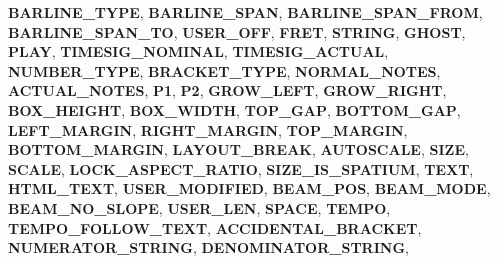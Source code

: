 \begin{DoxyCompactItemize}
{\bfseries B\+A\+R\+L\+I\+N\+E\+\_\+\+T\+Y\+PE}, 
{\bfseries B\+A\+R\+L\+I\+N\+E\+\_\+\+S\+P\+AN}, 
\newline
{\bfseries B\+A\+R\+L\+I\+N\+E\+\_\+\+S\+P\+A\+N\+\_\+\+F\+R\+OM}, 
{\bfseries B\+A\+R\+L\+I\+N\+E\+\_\+\+S\+P\+A\+N\+\_\+\+TO}, 
{\bfseries U\+S\+E\+R\+\_\+\+O\+FF}, 
{\bfseries F\+R\+ET}, 
\newline
{\bfseries S\+T\+R\+I\+NG}, 
{\bfseries G\+H\+O\+ST}, 
{\bfseries P\+L\+AY}, 
{\bfseries T\+I\+M\+E\+S\+I\+G\+\_\+\+N\+O\+M\+I\+N\+AL}, 
\newline
{\bfseries T\+I\+M\+E\+S\+I\+G\+\_\+\+A\+C\+T\+U\+AL}, 
{\bfseries N\+U\+M\+B\+E\+R\+\_\+\+T\+Y\+PE}, 
{\bfseries B\+R\+A\+C\+K\+E\+T\+\_\+\+T\+Y\+PE}, 
{\bfseries N\+O\+R\+M\+A\+L\+\_\+\+N\+O\+T\+ES}, 
\newline
{\bfseries A\+C\+T\+U\+A\+L\+\_\+\+N\+O\+T\+ES}, 
{\bfseries P1}, 
{\bfseries P2}, 
{\bfseries G\+R\+O\+W\+\_\+\+L\+E\+FT}, 
\newline
{\bfseries G\+R\+O\+W\+\_\+\+R\+I\+G\+HT}, 
{\bfseries B\+O\+X\+\_\+\+H\+E\+I\+G\+HT}, 
{\bfseries B\+O\+X\+\_\+\+W\+I\+D\+TH}, 
{\bfseries T\+O\+P\+\_\+\+G\+AP}, 
\newline
{\bfseries B\+O\+T\+T\+O\+M\+\_\+\+G\+AP}, 
{\bfseries L\+E\+F\+T\+\_\+\+M\+A\+R\+G\+IN}, 
{\bfseries R\+I\+G\+H\+T\+\_\+\+M\+A\+R\+G\+IN}, 
{\bfseries T\+O\+P\+\_\+\+M\+A\+R\+G\+IN}, 
\newline
{\bfseries B\+O\+T\+T\+O\+M\+\_\+\+M\+A\+R\+G\+IN}, 
{\bfseries L\+A\+Y\+O\+U\+T\+\_\+\+B\+R\+E\+AK}, 
{\bfseries A\+U\+T\+O\+S\+C\+A\+LE}, 
{\bfseries S\+I\+ZE}, 
\newline
{\bfseries S\+C\+A\+LE}, 
{\bfseries L\+O\+C\+K\+\_\+\+A\+S\+P\+E\+C\+T\+\_\+\+R\+A\+T\+IO}, 
{\bfseries S\+I\+Z\+E\+\_\+\+I\+S\+\_\+\+S\+P\+A\+T\+I\+UM}, 
{\bfseries T\+E\+XT}, 
\newline
{\bfseries H\+T\+M\+L\+\_\+\+T\+E\+XT}, 
{\bfseries U\+S\+E\+R\+\_\+\+M\+O\+D\+I\+F\+I\+ED}, 
{\bfseries B\+E\+A\+M\+\_\+\+P\+OS}, 
{\bfseries B\+E\+A\+M\+\_\+\+M\+O\+DE}, 
\newline
{\bfseries B\+E\+A\+M\+\_\+\+N\+O\+\_\+\+S\+L\+O\+PE}, 
{\bfseries U\+S\+E\+R\+\_\+\+L\+EN}, 
{\bfseries S\+P\+A\+CE}, 
{\bfseries T\+E\+M\+PO}, 
\newline
{\bfseries T\+E\+M\+P\+O\+\_\+\+F\+O\+L\+L\+O\+W\+\_\+\+T\+E\+XT}, 
{\bfseries A\+C\+C\+I\+D\+E\+N\+T\+A\+L\+\_\+\+B\+R\+A\+C\+K\+ET}, 
{\bfseries N\+U\+M\+E\+R\+A\+T\+O\+R\+\_\+\+S\+T\+R\+I\+NG}, 
{\bfseries D\+E\+N\+O\+M\+I\+N\+A\+T\+O\+R\+\_\+\+S\+T\+R\+I\+NG}, 
\newline

\end{DoxyCompactItemize}
